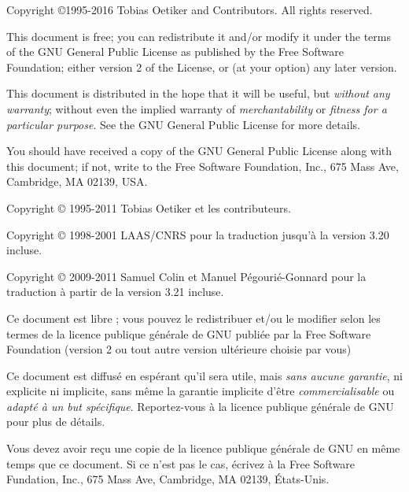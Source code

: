 \begin{small}
  \noindent Copyright \copyright 1995-2016 Tobias Oetiker and Contributors.  All rights reserved.

  This document is free; you can redistribute it and/or modify it
  under the terms of the GNU General Public License as published by
  the Free Software Foundation; either version 2 of the License, or
  (at your option) any later version.

  This document is distributed in the hope that it will be useful, but
  \emph{without any warranty}; without even the implied warranty of
  \emph{merchantability} or \emph{fitness for a particular purpose}\@.  See the GNU
  General Public License for more details.

  You should have received a copy of the GNU General Public License
  along with this document; if not, write to the Free Software
  Foundation, Inc., 675 Mass Ave, Cambridge, MA 02139, USA.

\vspace{4ex}

  Copyright \copyright{} 1995-2011 Tobias Oetiker et les contributeurs.

  Copyright \copyright{} 1998-2001 LAAS/CNRS pour la traduction
  jusqu'à la version 3.20 incluse.

  Copyright \copyright{} 2009-2011 Samuel Colin et Manuel
  Pégourié-Gonnard pour la traduction à partir de la version 3.21
  incluse.

  Ce document est libre ; vous pouvez le redistribuer et/ou le
  modifier selon les termes de la licence publique générale de GNU
  publiée par la Free Software Foundation (version 2 ou tout autre
  version ultérieure choisie par vous)

  Ce document est diffusé en espérant qu'il sera utile, mais \emph{sans
    aucune garantie}, ni explicite ni implicite, sans même la garantie
  implicite d'être \emph{commercialisable} ou \emph{adapté à un but
    spécifique}.  Reportez-vous à la licence publique générale de GNU pour
  plus de détails.

  Vous devez avoir reçu une copie de la licence publique générale de
  GNU en même temps que ce document. Si ce n'est pas le cas, écrivez à
  la Free Software Fundation, Inc., 675 Mass Ave, Cambridge, MA 02139,
  États-Unis.

\end{small}

